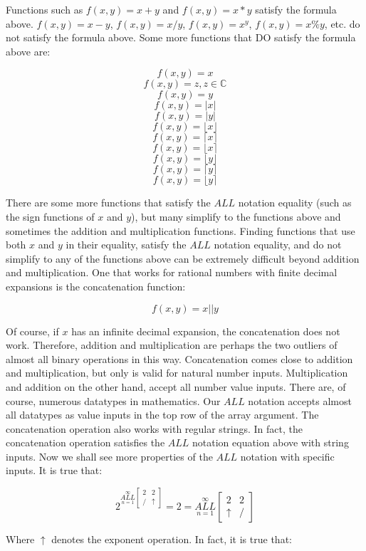 \documentclass{article}
\begin{document}
Functions such as $f(x,y)=x+y$ and $f(x,y)=x*y$ satisfy the formula above. $f(x,y)=x-y$, $f(x,y)=x/y$, $f(x,y)=x^y$, $f(x,y)=x\%y$, etc. do not satisfy the formula above. Some more functions that DO satisfy the formula above are:

$$f(x,y)=x$$
$$f(x,y)=z, z\in\mathbb{C}$$ 
$$f(x,y)=y$$ 
$$f(x,y)=|x|$$ 
$$f(x,y)=|y|$$ 
$$f(x,y)=\lfloor x \rfloor$$ 
$$f(x,y)=\lceil x \rceil$$
$$f(x,y)=\lfloor x \rceil$$
$$f(x,y)=\lfloor y \rfloor$$ 
$$f(x,y)=\lceil y \rceil$$
$$f(x,y)=\lfloor y \rceil$$

There are some more functions that satisfy the $ALL$ notation equality (such as the sign functions of $x$ and $y$), but many simplify to the functions above and sometimes the addition and multiplication functions. Finding functions that use both $x$ and $y$ in their equality, satisfy the $ALL$ notation equality, and do not simplify to any of the functions above can be extremely difficult beyond addition and multiplication. One that works for rational numbers with finite decimal expansions is the concatenation function:

$$f(x,y) = x||y$$

Of course, if $x$ has an infinite decimal expansion, the concatenation does not work. Therefore, addition and multiplication are perhaps the two outliers of almost all binary operations in this way. Concatenation comes close to addition and multiplication, but only is valid for natural number inputs. Multiplication and addition on the other hand, accept all number value inputs. There are, of course, numerous datatypes in mathematics. Our $ALL$ notation accepts almost all datatypes as value inputs in the top row of the array argument. The concatenation operation also works with regular strings. In fact, the concatenation operation satisfies the $ALL$ notation equation above with string inputs. Now we shall see more properties of the $ALL$ notation with specific inputs. It is true that:

$$2^{\underset{n=1}{\overset{\infty}{ALL}} \begin{bmatrix}
2 & 2 \\
/ & \uparrow
\end{bmatrix}} = 2 = \underset{n=1}{\overset{\infty}{ALL}} \begin{bmatrix}
2 & 2 \\
\uparrow & /
\end{bmatrix}$$

Where $\uparrow$ denotes the exponent operation. In fact, it is true that:
\end{document}

